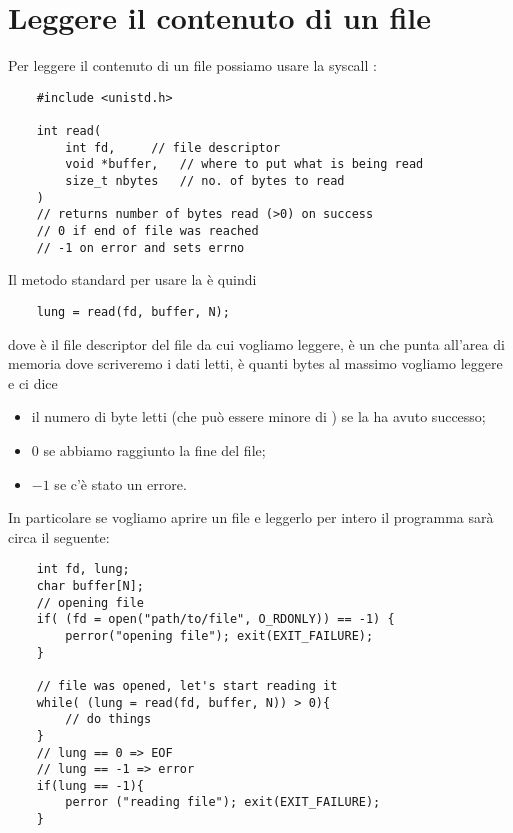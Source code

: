 \section{Leggere il contenuto di un file}

Per leggere il contenuto di un file possiamo usare la syscall :
\begin{verbatim}
    #include <unistd.h>

    int read(
        int fd,     // file descriptor
        void *buffer,   // where to put what is being read
        size_t nbytes   // no. of bytes to read
    )
    // returns number of bytes read (>0) on success
    // 0 if end of file was reached
    // -1 on error and sets errno
\end{verbatim}

Il metodo standard per usare la  è quindi 
\begin{verbatim}
    lung = read(fd, buffer, N);
\end{verbatim}
dove  è il file descriptor del file da cui vogliamo leggere,  è un  che punta all'area di memoria dove scriveremo i dati letti,  è quanti bytes al massimo vogliamo leggere e  ci dice \begin{itemize}
    \item il numero di byte letti (che può essere minore di ) se la  ha avuto successo;
    \item $0$ se abbiamo raggiunto la fine del file;
    \item $-1$ se c'è stato un errore.
\end{itemize}

In particolare se vogliamo aprire un file e leggerlo per intero il programma sarà circa il seguente:
\begin{verbatim}
    int fd, lung;
    char buffer[N];
    // opening file
    if( (fd = open("path/to/file", O_RDONLY)) == -1) {
        perror("opening file"); exit(EXIT_FAILURE);
    }

    // file was opened, let's start reading it
    while( (lung = read(fd, buffer, N)) > 0){
        // do things
    }
    // lung == 0 => EOF
    // lung == -1 => error
    if(lung == -1){
        perror ("reading file"); exit(EXIT_FAILURE);
    }
\end{verbatim}